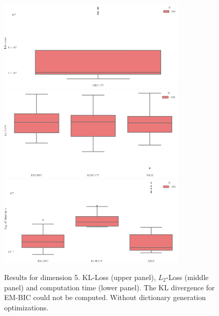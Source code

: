 \begin{figure}
\center
    \includegraphics[width=0.8\textwidth]{./TeX_files/dict_gen_loss_dim_5_KL.png}
    \includegraphics[width=0.8\textwidth]{./TeX_files/dict_gen_loss_dim_5_L2.png}
    \includegraphics[width=0.8\textwidth]{./TeX_files/dict_gen_time_dim_5.png}
    \caption{Results for dimension 5. KL-Loss (upper panel), $L_2$-Loss (middle panel) and computation time (lower panel). The KL divergence for EM-BIC could not be computed. Without dictionary generation optimizations.}
    \label{fig:result_dict_gen_dim_5}
\end{figure}

